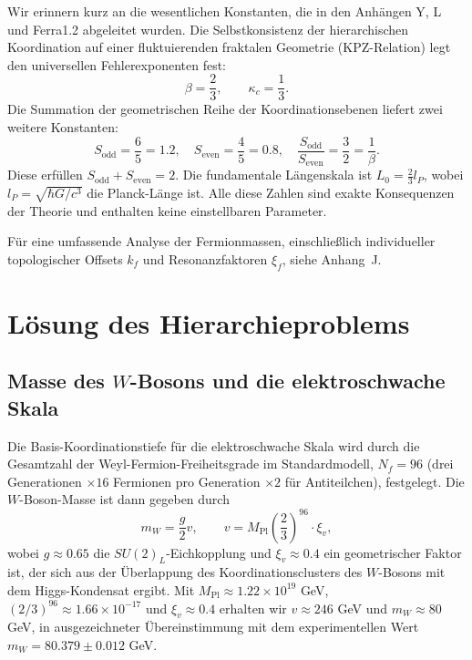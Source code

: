 \documentclass[11pt,a4paper]{article}
\theoremstyle{remark}
\begin{document}
	Wir erinnern kurz an die wesentlichen Konstanten, die in den Anhängen Y, L und Ferra1.2 abgeleitet wurden. Die Selbstkonsistenz der hierarchischen Koordination auf einer fluktuierenden fraktalen Geometrie (KPZ-Relation) legt den universellen Fehlerexponenten fest:
	\begin{equation}
		\beta = \frac{2}{3}, \qquad \kappa_c = \frac{1}{3}.
	\end{equation}
	Die Summation der geometrischen Reihe der Koordinationsebenen liefert zwei weitere Konstanten:
	\begin{equation}
		S_{\mathrm{odd}} = \frac{6}{5} = 1.2, \quad S_{\mathrm{even}} = \frac{4}{5} = 0.8, \quad \frac{S_{\mathrm{odd}}}{S_{\mathrm{even}}} = \frac{3}{2} = \frac{1}{\beta}.
	\end{equation}
	Diese erfüllen \(S_{\mathrm{odd}} + S_{\mathrm{even}} = 2\). Die fundamentale Längenskala ist \(L_0 = \frac{2}{3} l_P\), wobei \(l_P = \sqrt{\hbar G / c^3}\) die Planck-Länge ist. Alle diese Zahlen sind exakte Konsequenzen der Theorie und enthalten keine einstellbaren Parameter.
	
	Für eine umfassende Analyse der Fermionmassen, einschließlich individueller topologischer Offsets \(k_f\) und Resonanzfaktoren \(\xi_f\), siehe Anhang~J.
	
	\section{Lösung des Hierarchieproblems}
	
	\subsection{Masse des \(W\)-Bosons und die elektroschwache Skala}
	
	Die Basis-Koordinationstiefe für die elektroschwache Skala wird durch die Gesamtzahl der Weyl-Fermion-Freiheitsgrade im Standardmodell, \(N_f = 96\) (drei Generationen \(\times 16\) Fermionen pro Generation \(\times 2\) für Antiteilchen), festgelegt. Die \(W\)-Boson-Masse ist dann gegeben durch
	\begin{equation}
		m_W = \frac{g}{2} v, \qquad v = M_{\mathrm{Pl}} \left( \frac{2}{3} \right)^{96} \cdot \xi_v,
		\label{eq:mw_yuct}
	\end{equation}
	wobei \(g \approx 0.65\) die \(SU(2)_L\)-Eichkopplung und \(\xi_v \approx 0.4\) ein geometrischer Faktor ist, der sich aus der Überlappung des Koordinationsclusters des \(W\)-Bosons mit dem Higgs-Kondensat ergibt. Mit \(M_{\mathrm{Pl}} \approx 1.22\times10^{19}\) GeV, \((2/3)^{96} \approx 1.66\times10^{-17}\) und \(\xi_v \approx 0.4\) erhalten wir \(v \approx 246\) GeV und \(m_W \approx 80\) GeV, in ausgezeichneter Übereinstimmung mit dem experimentellen Wert \(m_W = 80.379 \pm 0.012\) GeV.
	
\end{document}
